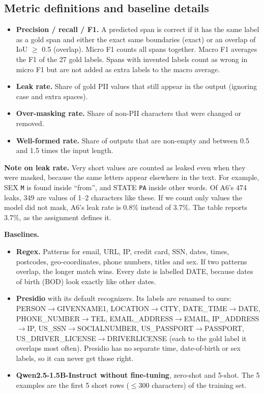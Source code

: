\documentclass[10pt]{article}
\begin{document}
\subsection{Metric definitions and baseline details}\label{app:b2}
\begin{itemize}
  \item \textbf{Precision / recall / F1.} A predicted span is correct if it has the same label as a gold span and either the exact same boundaries (exact) or an overlap of IoU $\ge$ 0.5 (overlap). Micro F1 counts all spans together. Macro F1 averages the F1 of the 27 gold labels. Spans with invented labels count as wrong in micro F1 but are not added as extra labels to the macro average.
  \item \textbf{Leak rate.} Share of gold PII values that still appear in the output (ignoring case and extra spaces).
  \item \textbf{Over-masking rate.} Share of non-PII characters that were changed or removed.
  \item \textbf{Well-formed rate.} Share of outputs that are non-empty and between 0.5 and 1.5 times the input length.
\end{itemize}

\textbf{Note on leak rate.} Very short values are counted as leaked even when they were masked, because the same letters appear elsewhere in the text. For example, SEX \texttt{M} is found inside ``from'', and STATE \texttt{PA} inside other words. Of A6's 474 leaks, 349 are values of 1--2 characters like these. If we count only values the model did not mask, A6's leak rate is 0.8\% instead of 3.7\%. The table reports 3.7\%, as the assignment defines it.

\textbf{Baselines.}
\begin{itemize}
  \item \textbf{Regex.} Patterns for email, URL, IP, credit card, SSN, dates, times, postcodes, geo-coordinates, phone numbers, titles and sex. If two patterns overlap, the longer match wins. Every date is labelled DATE, because dates of birth (BOD) look exactly like other dates.
  \item \textbf{Presidio} with its default recognizers. Its labels are renamed to ours: PERSON$\to$GIVENNAME1, LOCATION$\to$CITY, DATE\_TIME$\to$DATE, PHONE\_NUMBER$\to$TEL, EMAIL\_ADDRESS$\to$EMAIL, IP\_ADDRESS$\to$IP, US\_SSN$\to$SOCIALNUMBER, US\_PASSPORT$\to$PASSPORT, US\_DRIVER\_LICENSE$\to$DRIVERLICENSE (each to the gold label it overlaps most often). Presidio has no separate time, date-of-birth or sex labels, so it can never get those right.
  \item \textbf{Qwen2.5-1.5B-Instruct without fine-tuning}, zero-shot and 5-shot. The 5 examples are the first 5 short rows ($\le$300 characters) of the training set.
\end{itemize}
\end{document}
